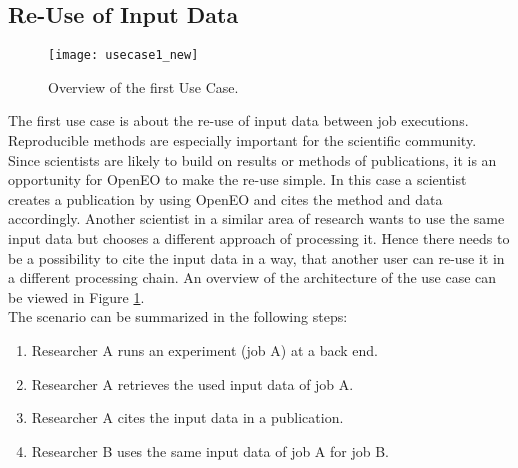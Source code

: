 \documentclass[draft,final]{vutinfth} %
\begin{document}
\subsection{Re-Use of Input Data}\label{UseCase1}
\begin{figure}[h]
	\centering
	\texttt{[image: usecase1\_new]}
	\caption{Overview of the first Use Case.}
	\label{fig:usecase1} %
\end{figure}
The first use case is about the re-use of input data between job executions. Reproducible methods are especially important for the scientific community. Since scientists are likely to build on results or methods of publications, it is an opportunity for OpenEO to make the re-use simple. In this case a scientist creates a publication by using OpenEO and cites the method and data accordingly. Another scientist in a similar area of research wants to use the same input data but chooses a different approach of processing it. Hence there needs to be a possibility to cite the input data in a way, that another user can re-use it in a different processing chain. 
An overview of the architecture of the use case can be viewed in Figure \ref{fig:usecase1}. \\
The scenario can be summarized in the following steps: \\

\begin{enumerate}
	\item Researcher A runs an experiment (job A) at a back end.
	\item Researcher A retrieves the used input data of job A.
	\item Researcher A cites the input data in a publication.
	\item Researcher B uses the same input data of job A for job B.  
\end{enumerate}
\end{document}
